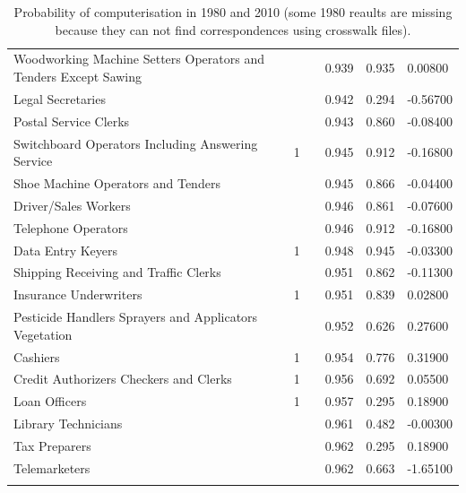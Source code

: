 \documentclass[11pt]{report}
\numberwithin{equation}{chapter}
\begin{document}
\begin{spacing}{2}
\begin{longtable}{ p{} p{} p{}  p{}  p{}  p{} }
Woodworking Machine Setters Operators and Tenders Except Sawing	&		&	&	0.939	&	0.935	&	0.00800	\\
Legal Secretaries	&		&	&	0.942	&	0.294	&	-0.56700	\\
Postal Service Clerks	&		&	&	0.943	&	0.860	&	-0.08400	\\
Switchboard Operators Including Answering Service	&	1	&	&	0.945	&	0.912	&	-0.16800	\\
Shoe Machine Operators and Tenders	&		&	&	0.945	&	0.866	&	-0.04400	\\
Driver/Sales Workers	&		&	&	0.946	&	0.861	&	-0.07600	\\
Telephone Operators	&		&	&	0.946	&	0.912	&	-0.16800	\\
Data Entry Keyers	&	1	&	&	0.948	&	0.945	&	-0.03300	\\
Shipping Receiving and Traffic Clerks	&		&	&	0.951	&	0.862	&	-0.11300	\\
Insurance Underwriters	&	1	&	&	0.951	&	0.839	&	0.02800	\\
Pesticide Handlers Sprayers and Applicators Vegetation	&		&	&	0.952	&	0.626	&	0.27600	\\
Cashiers	&	1	&	&	0.954	&	0.776	&	0.31900	\\
Credit Authorizers Checkers and Clerks	&	1	&	&	0.956	&	0.692	&	0.05500	\\
Loan Officers	&	1	&	&	0.957	&	0.295	&	0.18900	\\
Library Technicians	&		&	&	0.961	&	0.482	&	-0.00300	\\
Tax Preparers	&		&	&	0.962	&	0.295	&	0.18900	\\
Telemarketers	&		&	&	0.962	&	0.663	&	-1.65100	\\
\hline 

\caption{Probability of computerisation in 1980 and 2010 (some 1980 reaults are missing because they can not find correspondences using crosswalk files).} 
\label{tab:myfirstlongtable}


\end{longtable}
\endgroup


\end{spacing}
\end{document}
